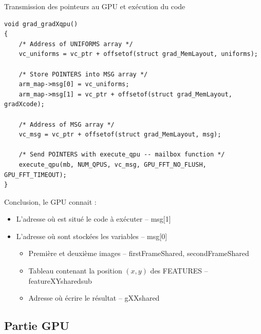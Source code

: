 \documentclass{bredelebeamer}
\begin{document}
\begin{frame}[fragile]{Transmission des pointeurs au GPU et exécution du code}

\begin{lstlisting}
void grad_gradXqpu()
{
    /* Address of UNIFORMS array */
    vc_uniforms = vc_ptr + offsetof(struct grad_MemLayout, uniforms);

    /* Store POINTERS into MSG array */
    arm_map->msg[0] = vc_uniforms;
    arm_map->msg[1] = vc_ptr + offsetof(struct grad_MemLayout, gradXcode);

    /* Address of MSG array */
    vc_msg = vc_ptr + offsetof(struct grad_MemLayout, msg);

    /* Send POINTERS with execute_qpu -- mailbox function */
    execute_qpu(mb, NUM_QPUS, vc_msg, GPU_FFT_NO_FLUSH, GPU_FFT_TIMEOUT);
}
\end{lstlisting}

\begin{alertblock}{Conclusion, le GPU connait :}
\begin{itemize}
\item L'adresse où est situé le code à exécuter -- msg[1]
\item L'adresse où sont stockées les variables -- msg[0]
	\begin{itemize}
		\item Première et deuxième images -- firstFrameShared, secondFrameShared
		\item Tableau contenant la position $(x,y)$ des FEATURES -- featureXYsharedsub
		\item Adresse où écrire le résultat -- gXXshared
	\end{itemize}
\end{itemize}
\end{alertblock}

\end{frame}



\subsection{Partie GPU}

\end{document}
